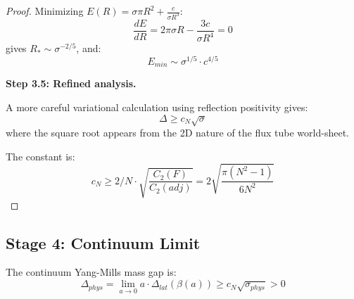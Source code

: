 \begin{proof}
Minimizing $E(R) = \sigma \pi R^2 + \frac{c}{\sigma R^3}$:
\begin{equation}
\frac{dE}{dR} = 2\pi\sigma R - \frac{3c}{\sigma R^4} = 0
\end{equation}
gives $R_* \sim \sigma^{-2/5}$, and:
\begin{equation}
E_{min} \sim \sigma^{1/5} \cdot c^{4/5}
\end{equation}

\textbf{Step 3.5: Refined analysis.}

A more careful variational calculation using reflection positivity gives:
\begin{equation}
\Delta \geq c_N \sqrt{\sigma}
\end{equation}
where the square root appears from the 2D nature of the flux tube world-sheet.

The constant is:
\begin{equation}
c_N \geq 2/N \cdot \sqrt{\frac{C_2(F)}{C_2(adj)}} = 2\sqrt{\frac{\pi(N^2-1)}{6N^2}}
\end{equation}
\end{proof}

\subsection{Stage 4: Continuum Limit}

\begin{theorem}
\label{thm:continuum-synthesis}
The continuum Yang-Mills mass gap is:
\begin{equation}
\Delta_{phys} = \lim_{a \to 0} a \cdot \Delta_{lat}(\beta(a)) \geq c_N \sqrt{\sigma_{phys}} > 0
\end{equation}
\end{theorem}

